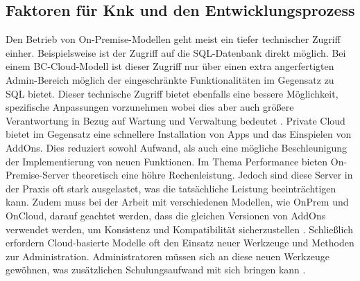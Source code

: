 \documentclass[12pt,bibtotoc]{article}
\begin{document}
			\subsection{Faktoren für Knk und den Entwicklungsprozess}
			Den Betrieb von On-Premise-Modellen geht meist ein tiefer technischer Zugriff einher. Beispielsweise ist der Zugriff auf die SQL-Datenbank direkt möglich. 
			Bei einem BC-Cloud-Modell ist dieser Zugriff nur über einen extra angerfertigten Admin-Bereich möglich der eingeschränkte Funktionalitäten im Gegensatz zu SQL bietet.
			Dieser technische Zugriff bietet ebenfalls eine bessere Möglichkeit, spezifische Anpassungen vorzunehmen wobei dies aber auch größere Verantwortung in Bezug auf Wartung und Verwaltung bedeutet \cite{Anhang}. \newline
			Private Cloud bietet im Gegensatz eine schnellere Installation von Apps und das Einspielen von AddOns. Dies reduziert sowohl Aufwand, als auch eine mögliche Beschleunigung der Implementierung von neuen Funktionen.
			Im Thema Performance bieten On-Premise-Server theoretisch eine höhre Rechenleistung. Jedoch sind diese Server in der Praxis oft stark ausgelastet, was die tatsächliche Leistung beeinträchtigen kann.
			Zudem muss bei der Arbeit mit verschiedenen Modellen, wie OnPrem und OnCloud, darauf geachtet werden, dass die gleichen Versionen von AddOns verwendet werden, um Konsistenz und Kompatibilität sicherzustellen \cite{Anhang}. \newline
			Schließlich erfordern Cloud-basierte Modelle oft den Einsatz neuer Werkzeuge und Methoden zur Administration. Administratoren müssen sich an diese neuen Werkzeuge gewöhnen, was zusätzlichen Schulungsaufwand mit sich bringen kann \cite{Anhang}.
			
			\newpage
\end{document}
